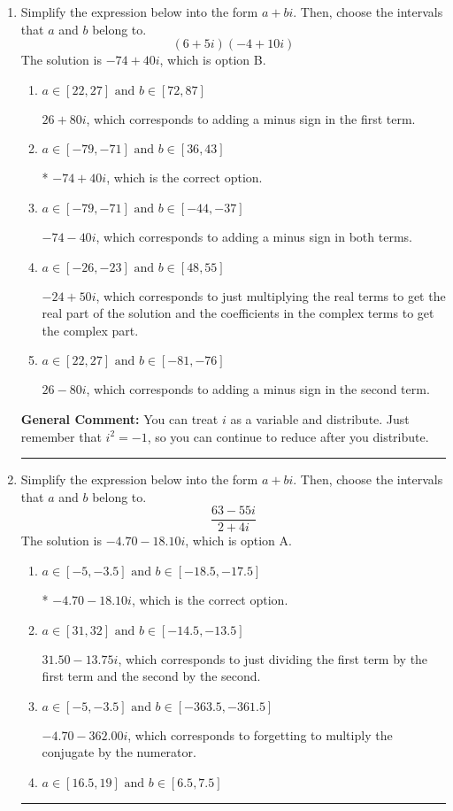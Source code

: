 \documentclass{extbook}[14pt]
\newcommand{\litem}[1]{\item #1

\rule{\textwidth}{0.4pt}}
\begin{document}
\begin{enumerate}\litem{
Simplify the expression below into the form $a+bi$. Then, choose the intervals that $a$ and $b$ belong to.
\[ (6 + 5 i)(-4 + 10 i) \]The solution is \( -74 + 40 i \), which is option B.\begin{enumerate}[label=\Alph*.]
\item \( a \in [22, 27] \text{ and } b \in [72, 87] \)

 $26 + 80 i$, which corresponds to adding a minus sign in the first term.
\item \( a \in [-79, -71] \text{ and } b \in [36, 43] \)

* $-74 + 40 i$, which is the correct option.
\item \( a \in [-79, -71] \text{ and } b \in [-44, -37] \)

 $-74 - 40 i$, which corresponds to adding a minus sign in both terms.
\item \( a \in [-26, -23] \text{ and } b \in [48, 55] \)

 $-24 + 50 i$, which corresponds to just multiplying the real terms to get the real part of the solution and the coefficients in the complex terms to get the complex part.
\item \( a \in [22, 27] \text{ and } b \in [-81, -76] \)

 $26 - 80 i$, which corresponds to adding a minus sign in the second term.
\end{enumerate}

\textbf{General Comment:} You can treat $i$ as a variable and distribute. Just remember that $i^2=-1$, so you can continue to reduce after you distribute.
}
\litem{
Simplify the expression below into the form $a+bi$. Then, choose the intervals that $a$ and $b$ belong to.
\[ \frac{63 - 55 i}{2 + 4 i} \]The solution is \( -4.70  - 18.10 i \), which is option A.\begin{enumerate}[label=\Alph*.]
\item \( a \in [-5, -3.5] \text{ and } b \in [-18.5, -17.5] \)

* $-4.70  - 18.10 i$, which is the correct option.
\item \( a \in [31, 32] \text{ and } b \in [-14.5, -13.5] \)

 $31.50  - 13.75 i$, which corresponds to just dividing the first term by the first term and the second by the second.
\item \( a \in [-5, -3.5] \text{ and } b \in [-363.5, -361.5] \)

 $-4.70  - 362.00 i$, which corresponds to forgetting to multiply the conjugate by the numerator.
\item \( a \in [16.5, 19] \text{ and } b \in [6.5, 7.5] \)


\end{enumerate}}
\end{enumerate}
\end{document}
